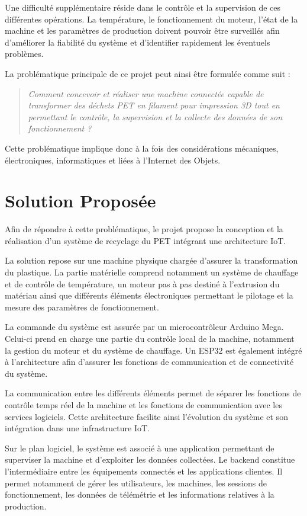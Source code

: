 Une difficulté supplémentaire réside dans le contrôle et la supervision de
ces différentes opérations. La température, le fonctionnement du moteur,
l'état de la machine et les paramètres de production doivent pouvoir être
surveillés afin d'améliorer la fiabilité du système et d'identifier
rapidement les éventuels problèmes.

La problématique principale de ce projet peut ainsi être formulée comme
suit :

\begin{quote}
\textit{Comment concevoir et réaliser une machine connectée capable de
transformer des déchets PET en filament pour impression 3D tout en
permettant le contrôle, la supervision et la collecte des données de son
fonctionnement ?}
\end{quote}

Cette problématique implique donc à la fois des considérations mécaniques,
électroniques, informatiques et liées à l'Internet des Objets.

\section{Solution Proposée}

Afin de répondre à cette problématique, le projet propose la conception et
la réalisation d'un système de recyclage du PET intégrant une architecture
IoT.

La solution repose sur une machine physique chargée d'assurer la
transformation du plastique. La partie matérielle comprend notamment un
système de chauffage et de contrôle de température, un moteur pas à pas
destiné à l'extrusion du matériau ainsi que différents éléments
électroniques permettant le pilotage et la mesure des paramètres de
fonctionnement.

La commande du système est assurée par un microcontrôleur Arduino Mega.
Celui-ci prend en charge une partie du contrôle local de la machine,
notamment la gestion du moteur et du système de chauffage. Un ESP32 est
également intégré à l'architecture afin d'assurer les fonctions de
communication et de connectivité du système.

La communication entre les différents éléments permet de séparer les
fonctions de contrôle temps réel de la machine et les fonctions de
communication avec les services logiciels. Cette architecture facilite
ainsi l'évolution du système et son intégration dans une infrastructure
IoT.

Sur le plan logiciel, le système est associé à une application permettant
de superviser la machine et d'exploiter les données collectées. Le backend
constitue l'intermédiaire entre les équipements connectés et les
applications clientes. Il permet notamment de gérer les utilisateurs, les
machines, les sessions de fonctionnement, les données de télémétrie et les
informations relatives à la production.

